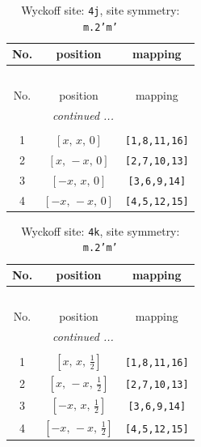 \documentclass[fleqn,8pt]{jsarticle}
\begin{document}
\begin{longtable}{ccc}
\caption{Wyckoff site: {\tt 4j}, site symmetry: {\tt m.2'm'}}
 \\
 \hline \hline
No. & position & mapping \\ \hline \endfirsthead

\multicolumn{2}{l}{\tablename\ \thetable{}} \\
 \hline \hline
No. & position & mapping \\ \hline \endhead

 \hline \hline
\multicolumn{2}{r}{\footnotesize\it continued ...} \\ \endfoot

 \hline \hline
\multicolumn{2}{r}{} \\ \endlastfoot

1 & $\left[ x,\, x,\, 0 \right]$ & {\tt [1,8,11,16]} \\ \hline
2 & $\left[ x,\, - x,\, 0 \right]$ & {\tt [2,7,10,13]} \\ \hline
3 & $\left[ - x,\, x,\, 0 \right]$ & {\tt [3,6,9,14]} \\ \hline
4 & $\left[ - x,\, - x,\, 0 \right]$ & {\tt [4,5,12,15]} \\
\end{longtable}
\renewcommand{\arraystretch}{1.2}
\begin{longtable}{ccc}
\caption{Wyckoff site: {\tt 4k}, site symmetry: {\tt m.2'm'}}
 \\
 \hline \hline
No. & position & mapping \\ \hline \endfirsthead

\multicolumn{2}{l}{\tablename\ \thetable{}} \\
 \hline \hline
No. & position & mapping \\ \hline \endhead

 \hline \hline
\multicolumn{2}{r}{\footnotesize\it continued ...} \\ \endfoot

 \hline \hline
\multicolumn{2}{r}{} \\ \endlastfoot

1 & $\left[ x,\, x,\, \frac{1}{2} \right]$ & {\tt [1,8,11,16]} \\ \hline
2 & $\left[ x,\, - x,\, \frac{1}{2} \right]$ & {\tt [2,7,10,13]} \\ \hline
3 & $\left[ - x,\, x,\, \frac{1}{2} \right]$ & {\tt [3,6,9,14]} \\ \hline
4 & $\left[ - x,\, - x,\, \frac{1}{2} \right]$ & {\tt [4,5,12,15]} \\
\end{longtable}
\end{document}
